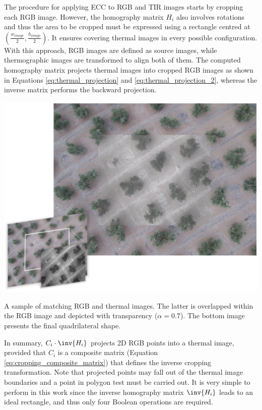 The procedure for applying ECC to RGB and TIR images starts by cropping each RGB image. However, the homography matrix $H_i$ also involves rotations and thus the area to be cropped must be expressed using a rectangle centred at $(\frac{w_{\textit{image}}}{2}, \frac{h_{\textit{image}}}{2})$. It ensures covering thermal images in every possible configuration. With this approach, RGB images are defined as source images, while thermographic images are transformed to align both of them. The computed homography matrix projects thermal images into cropped RGB images as shown in Equations \ref{eq:thermal_projection} and \ref{eq:thermal_projection_2}, whereas the inverse matrix performs the backward projection. 

\begin{marginfigure}[.1cm]
	\includegraphics{figs/thermal_projection/thermal_ecc_registration.png}
	\caption{A sample of matching RGB and thermal images. The latter is overlapped within the RGB image and depicted with transparency ($\alpha = 0.7$). The bottom image presents the final quadrilateral shape. }
	\label{fig:thermal_ecc_registration}
\end{marginfigure}
In summary, $C_{i} \cdot \inv{H_i}$ projects 2D RGB points into a thermal image, provided that $C_{i}$ is a composite matrix (Equation \ref{eq:cropping_composite_matrix}) that defines the inverse cropping transformation. Note that projected points may fall out of the thermal image boundaries and a point in polygon test must be carried out. It is very simple to perform in this work since the inverse homography matrix $\inv{H_i}$ leads to an ideal rectangle, and thus only four Boolean operations are required.  
